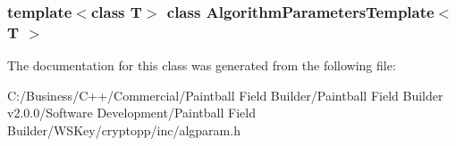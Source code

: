 \subsubsection*{template$<$class T$>$ class AlgorithmParametersTemplate$<$ T $>$}



The documentation for this class was generated from the following file:\begin{DoxyCompactItemize}
\item 
C:/Business/C++/Commercial/Paintball Field Builder/Paintball Field Builder v2.0.0/Software Development/Paintball Field Builder/WSKey/cryptopp/inc/algparam.h\end{DoxyCompactItemize}
